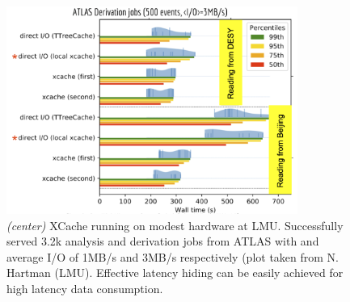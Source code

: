 \begin{figure}[h]
  \centering
  \includegraphics[height=6.8cm]{lmu.png}
  \caption{{\em (center)} XCache running on modest hardware at LMU. Successfully served 3.2k analysis and derivation jobs from ATLAS with and average I/O of 1MB/s and 3MB/s respectively (plot taken from N. Hartman (LMU). Effective latency hiding can be easily achieved for high latency data consumption.}
  \label{fig:datalake-sketch}
\end{figure}




